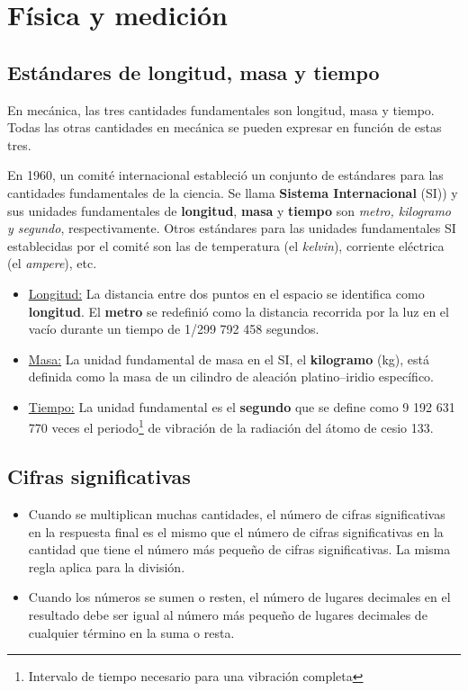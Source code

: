 \section{Física y medición}
  \subsection{Estándares de longitud, masa y tiempo}
    \PN En mecánica, las tres cantidades fundamentales son longitud, masa y tiempo. Todas las otras cantidades en
    mecánica se pueden expresar en función de estas tres.

    \PN En 1960, un comité internacional estableció un conjunto de estándares para las cantidades fundamentales de la
    ciencia. Se llama \textbf{Sistema Internacional} (SI)) y sus unidades fundamentales de \textbf{longitud},
    \textbf{masa} y \textbf{tiempo} son \textit{metro, kilogramo y segundo}, respectivamente. Otros estándares para las
    unidades fundamentales SI establecidas por el comité son las de temperatura (el \textit{kelvin}), corriente
    eléctrica (el \textit{ampere}), etc.
    \begin{itemize}
      \item \underline{Longitud:} La distancia entre dos puntos en el espacio se identifica como \textbf{longitud}. El
      \textbf{metro} se redefinió como la distancia recorrida por la luz en el vacío durante un tiempo de 1/299 792 458
      segundos.
      \item \underline{Masa:} La unidad fundamental de masa en el SI, el \textbf{kilogramo} (kg), está definida como la
      masa de un cilindro de aleación platino–iridio específico.
      \item \underline{Tiempo:} La unidad fundamental es el \textbf{segundo} que se define como 9 192 631 770 veces el
      periodo\footnote{Intervalo de tiempo necesario para una vibración completa} de vibración de la radiación del átomo
      de cesio 133.
    \end{itemize}

  \subsection{Cifras significativas}
    \begin{itemize}
      \item Cuando se multiplican muchas cantidades, el número de cifras significativas en la respuesta final es el
      mismo que el número de cifras significativas en la cantidad que tiene el número más pequeño de cifras
      significativas. La misma regla aplica para la división.
      \item Cuando los números se sumen o resten, el número de lugares decimales en el resultado debe ser igual al
      número más pequeño de lugares decimales de cualquier término en la suma o resta.
    \end{itemize}
